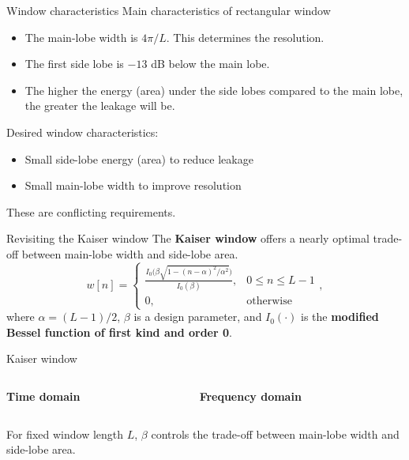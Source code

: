 \documentclass[10pt, aspectratio=169, handout]{beamer}
\begin{document}
\begin{frame}{Window characteristics}
Main characteristics of rectangular window
	\begin{itemize}
		\item The main-lobe width is $4\pi/L$. This determines the resolution.
		\item The first side lobe is $-13$ dB below the main lobe.
		\item The higher the energy (area) under the side lobes compared to the main lobe, the greater the leakage will be. 
	\end{itemize}

Desired window characteristics:
\begin{itemize}
		\item Small side-lobe energy (area) to reduce leakage
		\item Small main-lobe width to improve resolution
\end{itemize}
These are conflicting requirements.
\end{frame}

%
\begin{frame}{Revisiting the Kaiser window}
	The \textbf{Kaiser window} offers a nearly optimal trade-off between main-lobe width and side-lobe area.
	\begin{equation*}
	w[n] = \begin{cases}
	\displaystyle\frac{I_0\Big(\beta\sqrt{1- (n-\alpha)^2/\alpha^2}\Big)}{I_0(\beta)}, & 0 \leq n \leq L-1 \\
	0, & \text{otherwise}
	\end{cases},
	\end{equation*}
	where $\alpha = (L-1)/2$, $\beta$ is a design parameter, and $I_0(\cdot)$ is the \textbf{modified Bessel function of first kind and order 0}.
\end{frame}

%
\begin{frame}{Kaiser window}
\begin{columns}[t]
	\begin{column}{0.5\textwidth}
		\textbf{Time domain}
		\begin{center}
			\resizebox{\textwidth}{!}{}
		\end{center}
	\end{column}
	\begin{column}{0.5\textwidth}
		\textbf{Frequency domain}
		\begin{center}
			\resizebox{\textwidth}{!}{}
		\end{center}
	\end{column}
\end{columns}
For fixed window length $L$, $\beta$ controls the trade-off between main-lobe width and side-lobe area.
\end{frame}
\end{document}
